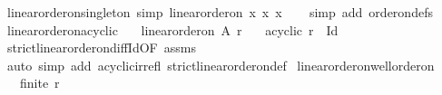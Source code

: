 \begin{isabellebody}
%
\isadelimproof
\isanewline
%
\endisadelimproof
\isanewline
{}\isamarkupfalse%
\ linear{\isacharunderscore}{\kern0pt}order{\isacharunderscore}{\kern0pt}on{\isacharunderscore}{\kern0pt}singleton\ {\isacharbrackleft}{\kern0pt}simp{\isacharbrackright}{\kern0pt}{\isacharcolon}{\kern0pt}\ {\isachardoublequoteopen}linear{\isacharunderscore}{\kern0pt}order{\isacharunderscore}{\kern0pt}on\ {\isacharbraceleft}{\kern0pt}x{\isacharbraceright}{\kern0pt}\ {\isacharbraceleft}{\kern0pt}{\isacharparenleft}{\kern0pt}x{\isacharcomma}{\kern0pt}\ x{\isacharparenright}{\kern0pt}{\isacharbraceright}{\kern0pt}{\isachardoublequoteclose}\isanewline
%
\isadelimproof
\ \ %
\endisadelimproof
%
\isatagproof
{}\isamarkupfalse%
\ {\isacharparenleft}{\kern0pt}simp\ add{\isacharcolon}{\kern0pt}\ order{\isacharunderscore}{\kern0pt}on{\isacharunderscore}{\kern0pt}defs{\isacharparenright}{\kern0pt}%
\endisatagproof
{\isafoldproof}%
%
\isadelimproof
\isanewline
%
\endisadelimproof
\isanewline
{}\isamarkupfalse%
\ linear{\isacharunderscore}{\kern0pt}order{\isacharunderscore}{\kern0pt}on{\isacharunderscore}{\kern0pt}acyclic{\isacharcolon}{\kern0pt}\isanewline
\ \ \ {\isachardoublequoteopen}linear{\isacharunderscore}{\kern0pt}order{\isacharunderscore}{\kern0pt}on\ A\ r{\isachardoublequoteclose}\isanewline
\ \ \ {\isachardoublequoteopen}acyclic\ {\isacharparenleft}{\kern0pt}r\ {\isacharminus}{\kern0pt}\ Id{\isacharparenright}{\kern0pt}{\isachardoublequoteclose}\isanewline
%
\isadelimproof
\ \ %
\endisadelimproof
%
\isatagproof
{}\isamarkupfalse%
\ strict{\isacharunderscore}{\kern0pt}linear{\isacharunderscore}{\kern0pt}order{\isacharunderscore}{\kern0pt}on{\isacharunderscore}{\kern0pt}diff{\isacharunderscore}{\kern0pt}Id{\isacharbrackleft}{\kern0pt}OF\ assms{\isacharbrackright}{\kern0pt}\isanewline
\ \ \isamarkupfalse%
\ {\isacharparenleft}{\kern0pt}auto\ simp\ add{\isacharcolon}{\kern0pt}\ acyclic{\isacharunderscore}{\kern0pt}irrefl\ strict{\isacharunderscore}{\kern0pt}linear{\isacharunderscore}{\kern0pt}order{\isacharunderscore}{\kern0pt}on{\isacharunderscore}{\kern0pt}def{\isacharparenright}{\kern0pt}%
\endisatagproof
{\isafoldproof}%
%
\isadelimproof
\isanewline
%
\endisadelimproof
\isanewline
{}\isamarkupfalse%
\ linear{\isacharunderscore}{\kern0pt}order{\isacharunderscore}{\kern0pt}on{\isacharunderscore}{\kern0pt}well{\isacharunderscore}{\kern0pt}order{\isacharunderscore}{\kern0pt}on{\isacharcolon}{\kern0pt}\isanewline
\ \ \ {\isachardoublequoteopen}finite\ r{\isachardoublequoteclose}\isanewline

\end{isabellebody}
